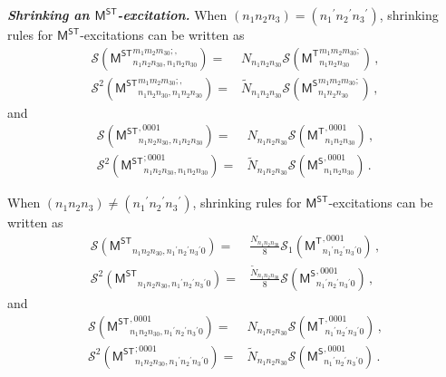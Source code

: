 \documentclass[11pt,nofootinbib,preprint]{revtex4-1}
\begin{document}
\textbf{\textit{Shrinking an $\mathsf{M^{ST}}$-excitation.}}
When $\left(n_1n_2n_3\right)=\left({n_1}^{\prime}{n_2}^{\prime}{n_3}^{\prime}\right)$, shrinking rules for $\mathsf{M^{ST}}$-excitations can be written as 
\begin{align}
	\mathcal{S} \left( {\mathsf{M}^{\mathsf{ST}}}_{n_1n_2n_30,n_1n_2n_30}^{m_1m_2m_30;,} \right) =&N_{n_1n_2n_30}\mathcal{S} \left( {\mathsf{M}^{\mathsf{T}}}_{n_1n_2n_30}^{m_1m_2m_30;} \right) \,,
	\\
	\mathcal{S} ^2\left( {\mathsf{M}^{\mathsf{ST}}}_{n_1n_2n_30,n_1n_2n_30}^{m_1m_2m_30;,} \right) =&\tilde{N}_{n_1n_2n_30}\mathcal{S} \left( {\mathsf{M}^{\mathsf{S}}}_{n_1n_2n_30}^{m_1m_2m_30;} \right) \,,
\end{align}
and
\begin{align}
	\mathcal{S} \left( {\mathsf{M}^{\mathsf{ST}}}_{n_1n_2n_30,n_1n_2n_30}^{,0001} \right) =&N_{n_1n_2n_30}\mathcal{S} \left( {\mathsf{M}^{\mathsf{T}}}_{n_1n_2n_30}^{,0001} \right) \,,
	\\
	\mathcal{S} ^2\left( {\mathsf{M}^{\mathsf{ST}}}_{n_1n_2n_30,n_1n_2n_30}^{;0001} \right) =&\tilde{N}_{n_1n_2n_30}\mathcal{S} \left( {\mathsf{M}^{\mathsf{S}}}_{n_1n_2n_30}^{,0001} \right) \,.
\end{align}

When $\left(n_1n_2n_3\right)\ne\left({n_1}^{\prime}{n_2}^{\prime}{n_3}^{\prime}\right)$, shrinking rules for $\mathsf{M^{ST}}$-excitations can be written as
\begin{align}
	\mathcal{S} \left( {\mathsf{M}^{\mathsf{ST}}}_{n_1n_2n_30,{n_1}^{\prime}{n_2}^{\prime}{n_3}^{\prime}0} \right) =&\frac{N_{n_1n_2n_30}}{8}\mathcal{S} _1\left( {\mathsf{M}^{\mathsf{T}}}_{{n_1}^{\prime}{n_2}^{\prime}{n_3}^{\prime}0}^{,0001} \right) \,,
	\\
	\mathcal{S} ^2\left( {\mathsf{M}^{\mathsf{ST}}}_{n_1n_2n_30,{n_1}^{\prime}{n_2}^{\prime}{n_3}^{\prime}0} \right) =&\frac{\tilde{N}_{n_1n_2n_30}}{8}\mathcal{S} \left( {\mathsf{M}^{\mathsf{S}}}_{{n_1}^{\prime}{n_2}^{\prime}{n_3}^{\prime}0}^{,0001} \right) \,,
\end{align}
and
\begin{align}
	\mathcal{S}\left( {\mathsf{M}^{\mathsf{ST}}}_{n_1n_2n_30,{n_1}^{\prime}{n_2}^{\prime}{n_3}^{\prime}0}^{,0001} \right) =&N_{n_1n_2n_30}\mathcal{S}\left( {\mathsf{M}^{\mathsf{T}}}_{{n_1}^{\prime}{n_2}^{\prime}{n_3}^{\prime}0}^{,0001} \right) \,,
	\\
	\mathcal{S} ^2\left( {\mathsf{M}^{\mathsf{ST}}}_{n_1n_2n_30,{n_1}^{\prime}{n_2}^{\prime}{n_3}^{\prime}0}^{;0001} \right) =&\tilde{N}_{n_1n_2n_30}\mathcal{S} \left( {\mathsf{M}^{\mathsf{S}}}_{{n_1}^{\prime}{n_2}^{\prime}{n_3}^{\prime}0}^{,0001} \right) \,.
\end{align}
\end{document}
